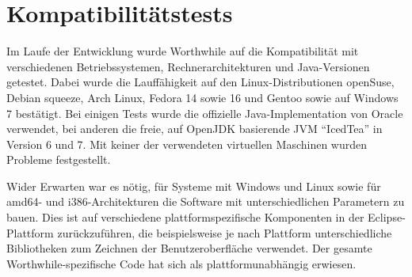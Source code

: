 \section{Kompatibilitätstests}
Im Laufe der Entwicklung wurde Worthwhile auf die Kompatibilität mit verschiedenen Betriebssystemen, Rechnerarchitekturen und Java-Versionen getestet. Dabei wurde die Lauffähigkeit auf den Linux-Distributionen openSuse, Debian squeeze, Arch Linux, Fedora 14 sowie 16 und Gentoo sowie auf Windows 7 bestätigt. Bei einigen Tests wurde die offizielle Java-Implementation von Oracle verwendet, bei anderen die freie, auf OpenJDK basierende JVM "`IcedTea"' in Version 6 und 7. Mit keiner der verwendeten virtuellen Maschinen wurden Probleme festgestellt.

Wider Erwarten war es nötig, für Systeme mit Windows und Linux sowie für amd64- und i386-Architekturen die Software mit unterschiedlichen Parametern zu bauen. Dies ist auf verschiedene plattformspezifische Komponenten in der Eclipse-Plattform zurückzuführen, die beispielsweise je nach Plattform unterschiedliche Bibliotheken zum Zeichnen der Benutzeroberfläche verwendet. Der gesamte Worthwhile-spezifische Code hat sich als plattformunabhängig erwiesen.
